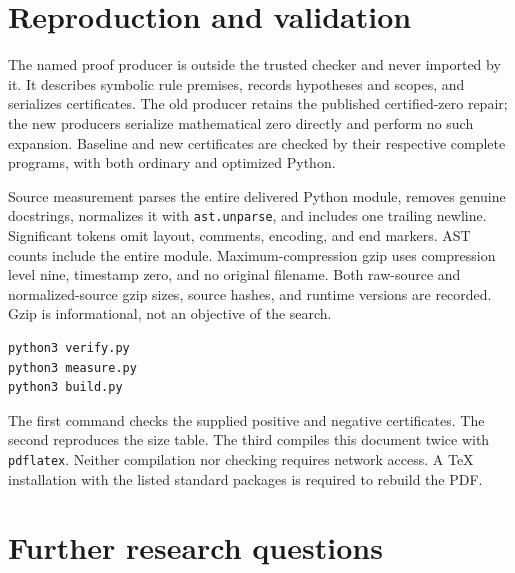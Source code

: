 \documentclass[11pt,letterpaper]{article}
\theoremstyle{definition}\newtheorem{definition}[theorem]{Definition}
\theoremstyle{remark}\newtheorem{remark}[theorem]{Remark}
\begin{document}
\section{Reproduction and validation}
\label{sec:validation}



The named proof producer is outside the trusted checker and never imported
by it. It describes symbolic rule premises, records hypotheses and scopes,
and serializes certificates. The old producer retains the published
certified-zero repair; the new producers serialize mathematical zero directly
and perform no such expansion. Baseline and new certificates are checked by
their respective complete programs, with both ordinary and optimized Python.

Source measurement parses the entire delivered Python module, removes
genuine docstrings, normalizes it with \texttt{ast.unparse}, and includes
one trailing newline. Significant tokens omit layout, comments, encoding,
and end markers. AST counts include the entire module. Maximum-compression
gzip uses compression level nine, timestamp zero, and no original filename.
Both raw-source and normalized-source gzip sizes, source hashes, and runtime
versions are recorded. Gzip is informational, not an objective of the search.

\begin{verbatim}
python3 verify.py
python3 measure.py
python3 build.py
\end{verbatim}

The first command checks the supplied positive and negative certificates.
The second reproduces the size table. The third compiles this document twice
with \texttt{pdflatex}. Neither compilation nor checking requires network
access. A TeX installation with the listed standard packages is required to
rebuild the PDF.

\section{Further research questions}
\label{sec:further}
\end{document}
